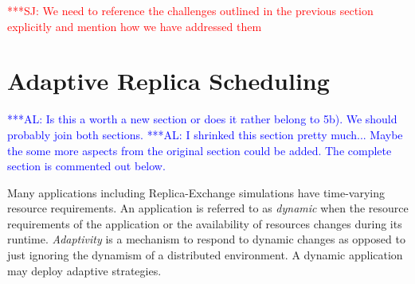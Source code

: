 \documentclass{rspublic}
\newcommand{\alnote}[1]{ {\textcolor{blue} { ***AL: #1 }}}
\newcommand{\jhanote}[1]{ {\textcolor{red} { ***SJ: #1 }}}
\newcommand{\alnote}[1]{}
\newcommand{\jhanote}[1]{}
\newcommand{\glidein}[1]{Glide-In }
\begin{document}

               

  
    



\jhanote{We need to reference the challenges outlined in the previous
  section explicitly and mention how we have addressed them}

      
 
\section{Adaptive Replica Scheduling}
\label{sec:adaptivitiy}    
\alnote{Is this a worth a new section or does it rather belong to 5b). We
should probably join both sections.}  
\alnote{I shrinked this section pretty much... Maybe the some more aspects from
the original section could be added. The complete section is commented out below.} 

Many applications including Replica-Exchange simulations have time-varying
resource requirements. %
An application is referred to as \emph{dynamic} when the resource requirements of 
the application or the availability of resources changes during its runtime.
\emph{Adaptivity} is a mechanism to respond to dynamic changes as opposed 
to just ignoring the dynamism of a distributed environment. A dynamic application 
may deploy adaptive strategies.
\end{document}

